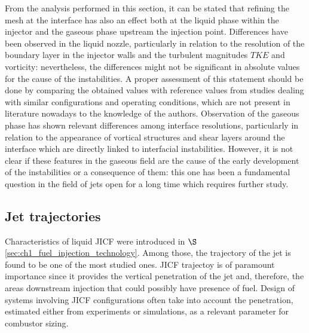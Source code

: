 From the analysis performed in this section, it can be stated that refining the mesh at the interface has also an effect both at the liquid phase within the injector and the gaseous phase upstream the injection point. Differences have been observed in the liquid nozzle, particularly in relation to the resolution of the boundary layer in the injector walls and the turbulent magnitudes $TKE$ and vorticity: nevertheless, the differences might not be significant in absolute values for the cause of the instabilities. A proper assessment of this statement should be done by comparing the obtained values with reference values from studies dealing with similar configurations and operating conditions, which are not present in literature nowadays to the knowledge of the authors. Observation of the gaseous phase has shown relevant differences among interface resolutions, particularly in relation to the appearance of vortical structures and shear layers around the interface which are directly linked to interfacial instabilities. However, it is not clear if these features in the gaseous field are the cause of the early development of the instabilities or a consequence of them: this one has been a fundamental question in the field of jets open for a long time  which requires further study. %










\subsection{Jet trajectories}
\label{subsec:ch5_jet_trajectories_results}

Characteristics of liquid JICF were introduced in $\S$\ref{sec:ch1_fuel_injection_technology}. Among those, the trajectory of the jet is found to be one of the most studied ones. JICF trajectoy is of paramount importance since it provides the vertical penetration of the jet and, therefore, the areas downstream injection that could possibly have presence of fuel. Design of systems involving JICF configurations often take into account the penetration, estimated either from experiments or simulations, as a relevant parameter for combustor sizing.

